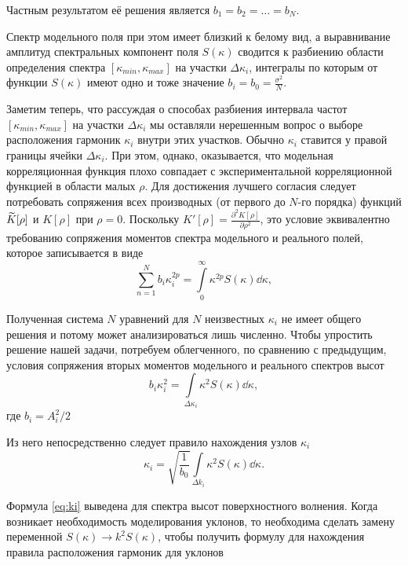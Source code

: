 Частным результатом её решения является $b_1 = b_2 = \dots = b_N$.

Спектр модельного поля при этом имеет близкий к белому вид, а выравнивание
амплитуд спектральных компонент поля $S(\kappa)$ сводится к разбиению области
определения спектра $[\kappa_{min},\kappa_{max}]$ на участки $\Delta
\kappa_i$, интегралы по
которым от функции  $S(\kappa)$ имеют одно и тоже значение $b_i = b_{0} =
\frac{\sigma^2}{N}$.

Заметим теперь, что рассуждая о способах разбиения интервала частот
$[\kappa_{min},
\kappa_{max}]$ на участки $\Delta \kappa_i$ мы оставляли нерешенным вопрос о выборе
расположения гармоник $\kappa_i$ внутри этих участков. Обычно  $\kappa_i$ ставится у
правой границы ячейки  $\Delta \kappa_i$. При этом, однако, оказывается, что
модельная корреляционная функция плохо совпадает с экспериментальной
корреляционной функцией в области малых  $\rho$. Для достижения лучшего
согласия следует потребовать сопряжения всех производных (от первого до $N$-го
порядка) функций $\widetilde K[\rho]$ и  $K[\rho]$ при  $\rho=0$. 
Поскольку $K'[\rho] = \frac{\partial^2 K[\rho]}{\partial \rho^2}$, это условие эквивалентно
требованию сопряжения моментов спектра модельного и реального полей, которое
записывается в виде
 \begin{equation}
    \sum\limits_{n=1}^{N} b_i \kappa_i^{2p} 
    = \int\limits_{0}^{\infty} \kappa^{2p}S(\kappa) \dd \kappa, 
\end{equation}

Полученная система $N$ уравнений для $N$ неизвестных $\kappa_i$ не имеет общего
решения и потому может анализироваться лишь численно. Чтобы упростить решение
нашей задачи, потребуем облегченного, по сравнению с предыдущим, условия
сопряжения вторых моментов модельного и реального спектров высот
 \begin{equation}
    b_i \kappa_i^2 = \int\limits_{\Delta \kappa_i} \kappa^2 S(\kappa) \dd \kappa,
\end{equation}
где $b_i= A_i^2 / 2$

Из него непосредственно следует правило нахождения узлов $\kappa_i$ 
\begin{equation}
    \label{eq:ki}
    {
        \kappa_i = \sqrt{\frac{1}{b_0}} \int\limits_{\Delta k_i} \kappa^2
        S(\kappa) \dd \kappa. 
    }
\end{equation}

Формула \eqref{eq:ki} выведена для спектра высот поверхностного волнения. Когда
возникает необходимость моделирования уклонов, то необходима сделать замену
переменной $S(\kappa) \to k^2 S(\kappa)$, чтобы получить формулу для нахождения правила
расположения гармоник для уклонов


